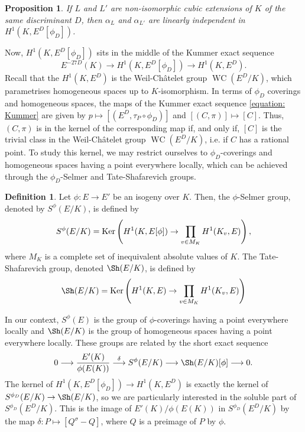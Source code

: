 \documentclass[oneside]{amsart}
\newcommand{\embrace}[3]{\left#1 #3 \right#2}
\newcommand{\lpar}[1]{\embrace{(}{)}{#1}}
\renewcommand{\ker}{\textnormal{Ker}}
\DeclareMathOperator{\wc}{WC}
\newtheorem{proposition}[X]{Proposition}
\theoremstyle{definition}
\newtheorem{definition}[X]{Definition}
\begin{document}
\begin{proposition}{\cite[Lemma 15]{Bhargava}}
    If $L$ and $L'$ are non-isomorphic cubic extensions of $K$ of the same discriminant $D$, then $\alpha_L$ and $\alpha_{L'}$ are linearly independent in $H^1(K, E^D[\phi_D])$.
\end{proposition}
Now, $H^1(K,E^D[\phi_D])$ sits in the middle of the Kummer exact sequence 
\begin{equation}
    \label{equation: Kummer}
    E^{-27D}(K) \longrightarrow H^1(K, E^D[\phi_D]) \longrightarrow H^1(K, E^D).
\end{equation}
Recall that the $H^1(K,E^D)$ is the Weil-Ch\^{a}telet group $\wc(E^D/K)$, which parametrises homogeneous spaces up to $K$-isomorphism. In terms of $\phi_D$ coverings and homogeneous spaces, the maps of the Kummer exact sequence \ref{equation: Kummer} are given by $p \mapsto [(E^D, \tau_{P}\circ\phi_D)]$ and $[(C, \pi)] \mapsto [C]$. Thus, $(C, \pi)$ is in the kernel of the corresponding map if, and only if, $[C]$ is the trivial class in the Weil-Ch\^{a}telet group $\wc(E^D/K)$, i.e. if $C$ has a rational point. To study this kernel, we may restrict ourselves to $\phi_D$-coverings and homogeneous spaces having a point everywhere locally, which can be achieved through the $\phi_D$-Selmer and Tate-Shafarevich groups. 
\begin{definition}{\cite[p. 332]{Silverman}}
    Let $\phi: E \to E'$ be an isogeny over $K$. Then, the $\phi$-Selmer group, denoted by $S^{\phi}(E/K)$, is defined by 
    $$
    S^{\phi}(E/K) = \ker\lpar{H^1(K, E[\phi])\to \prod_{v \in M_K} H^1(K_v, E)},
    $$
    where $M_K$ is a complete set of inequivalent absolute values of $K$. The Tate-Shafarevich group, denoted $\Sh(E/K)$, is defined by 
    $$
    \Sh(E/K) = \ker\lpar{H^1(K, E) \to \prod_{v \in M_K}H^1(K_v, E)}
    $$
\end{definition}
In our context, $S^{\phi}(E)$ is the group of $\phi$-coverings having a point everywhere locally and $\Sh(E/K)$ is the group of homogeneous spaces having a point everywhere locally. These groups are related by the short exact sequence
\begin{equation}
    \label{equation: Selmer-TS sequence}
    0 \longrightarrow \frac{E'(K)}{\phi(E(K))} \overset{\delta}{\longrightarrow} S^{\phi}(E/K) \longrightarrow \Sh(E/K)[\phi]\longrightarrow 0.
\end{equation}
The kernel of $H^1(K, E^D[\phi_D]) \to H^1(K, E^D)$ is exactly the kernel of $S^{\phi_D}(E/K)\to\Sh(E/K)$, so we are particularly interested in the soluble part of $S^{\phi_D}(E^D/K)$. This is the image of $E'(K)/\phi(E(K))$ in $S^{\phi_D}(E^D/K)$ by the map $\delta: P \mapsto [Q^{\sigma}-Q]$, where $Q$ is a preimage of $P$ by $\phi$.
\end{document}
